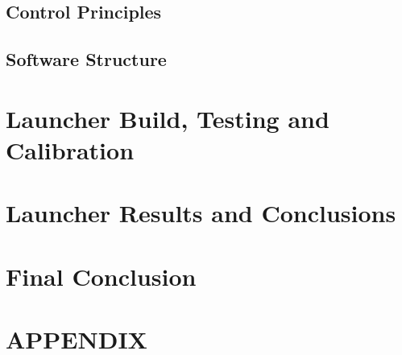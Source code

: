   \subsection{Control Principles}
  \label{sub:Control Principles}
  \subsection{Software Structure}
  \label{sub:Software Structure}


\clearpage
\section{Launcher Build, Testing and Calibration}
\label{sec:Launcher Build, Testing and Calibration}

\clearpage
\section{Launcher Results and Conclusions}
\label{sec:Launcher Results and Conclusions}

\clearpage
\section{Final Conclusion}
\label{sec:Final Conclusion}

\clearpage
\printbibliography


\clearpage
\section{APPENDIX}
\label{sec:APPENDIX}



